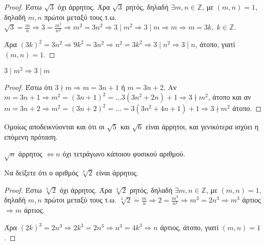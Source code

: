 \begin{proof}
  Έστω $ \sqrt{3} $ όχι άρρητος. Άρα $ \sqrt{3} $ ρητός, δηλαδή $ \exists m,n 
  \in \mathbb{Z} $, με $ (m,n)=1 $, δηλαδή $ m,n $ πρώτοι μεταξύ τους
  τ.ω. $ \sqrt{3} = \frac{m}{n} \Rightarrow 3 = \frac{m^{2}}{n^{2}} \Rightarrow 
  m^{2} = 3n^{2} \Rightarrow 3 \mid m^{2} \Rightarrow 3 \mid m  \Rightarrow m 
  \Rightarrow m = 3k, \; k \in \mathbb{Z}$. 

  Άρα $ (3k)^{2} = 3n^{2} \Rightarrow 9k^{2}=3n^{2} \Rightarrow n^{2} = 3k^{2} 
  \Rightarrow 3 \mid n^{2} \Rightarrow  3 \mid n$,  άτοπο, γιατί $ (m,n)=1 $.
\end{proof}

\begin{lem}
  $ 3 \mid m^{2} \Rightarrow 3 \mid m $
\end{lem}

\begin{proof}
  Έστω ότι $ 3 \nmid m \Rightarrow m = 3n +1 $ ή $ m = 3n+2 $. 
  Αν $ m=3n+1 \Rightarrow m^{2} = (3n+1)^{2} = \ldots 3(3n^{2}+2n)+1 \Rightarrow 
  3 \nmid m^{2}$, άτοπο και αν $ m =3n+2 \Rightarrow m^{2}=(3n+2)^{2} = \ldots = 
  3(3n^{2}+4n+1)+1 \Rightarrow 3 \nmid m^{2}$ άτοπο.
\end{proof}

\begin{rem}
  Ομοίως αποδεικνύονται και ότι οι $ \sqrt{5}$ και  $ \sqrt{6} $ είναι άρρητοι, 
  και γενικότερα ισχύει η επόμενη πρόταση.
\end{rem}

\begin{mybox3}
  \begin{prop}
    $ \sqrt{n} $ άρρητος $ \Leftrightarrow n $ όχι τετράγωνο κάποιου φυσικού αριθμού.
  \end{prop}
\end{mybox3}

\begin{example}
  Να δείξετε ότι ο αριθμός $ \sqrt[3]{2} $ είναι άρρητος.
\end{example}

\begin{proof}
  Έστω $ \sqrt[3]{2} $ όχι άρρητος. Άρα $ \sqrt[3]{2} $ ρητός, δηλαδή $ \exists m,n 
  \in \mathbb{Z} $, με $ (m,n)=1 $, δηλαδή $ m,n $ πρώτοι μεταξύ τους
  τ.ω. $ \sqrt[3]{2} = \frac{m}{n} \Rightarrow 2 = \frac{m^{3}}{n^{3}} \Rightarrow 
  m^{3} = 2n^{3} \Rightarrow m^{3} $ άρτιος $ \Rightarrow m $ άρτιος. 

  Άρα $ (2k)^{3} = 2n^{3} \Rightarrow 2k^{3}=2n^{3} \Rightarrow n^{3} = 4k^{3} 
  \Rightarrow n $ άρτιος,  άτοπο, γιατί $ (m,n)=1 $.
\end{proof}

